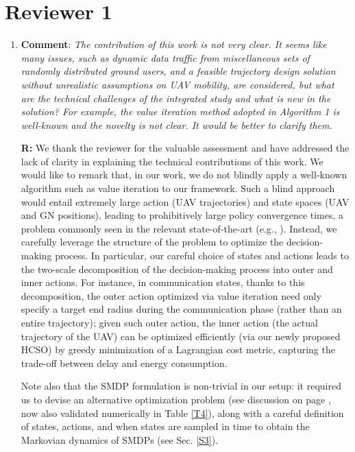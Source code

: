\documentclass[12pt, draftcls, onecolumn]{IEEEtran}
\theoremstyle{plain}
\theoremstyle{definition}
\theoremstyle{remark}
\begin{document}
\section*{Reviewer 1}
\begin{enumerate}
\item \textbf{Comment}: \emph{The contribution of this work is not very clear. It seems like many issues, such as dynamic data traffic from miscellaneous sets of randomly distributed ground users, and a feasible trajectory design solution without unrealistic assumptions on UAV mobility, are considered, but what are the technical challenges of the integrated study and what is new in the solution? For example, the value iteration method adopted in Algorithm 1 is well-known and the novelty is not clear. It would be better to clarify them.}
\vspace{2mm}

\textbf{R:} We thank the reviewer for the valuable assessment and have addressed the lack of clarity in explaining the technical contributions of this work. 
We would like to remark that, in our work, we do not blindly apply a well-known algorithm such as value iteration to our framework. Such a blind approach would entail extremely large action (UAV trajectories) and state spaces (UAV and GN positions), leading to prohibitively large policy convergence times, a problem commonly seen in the relevant state-of-the-art (e.g., \cite{CSCA-ADMM, DDQN}). Instead, we carefully leverage the structure of the problem to optimize the decision-making process. In particular, our careful choice of states and actions leads to the two-scale decomposition of the decision-making process into outer and inner actions. For instance, in communication states, thanks to this decomposition, the outer action optimized via value iteration need only specify a target end radius during the communication phase (rather than an entire trajectory); given such outer action, the inner action (the actual trajectory of the UAV) can be optimized efficiently (via our newly proposed HCSO) by greedy minimization of a Lagrangian cost metric, capturing the trade-off between delay and energy consumption. 
\vspace{2mm}

Note also that the SMDP formulation is non-trivial in our setup: it required us to devise an alternative optimization problem (see discussion on page \pageref{altopt}, now also validated numerically in Table \ref{T4}), along with a careful definition of states, actions, and when states are sampled in time to obtain the Markovian dynamics of SMDPs (see Sec. \ref{S3}).
\vspace{2mm}


\end{enumerate}
\end{document}

